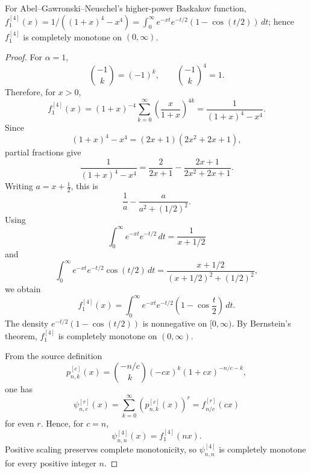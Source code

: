 \begin{proposition}
\label{res:baskakov-r4-alpha1-laplace-density-seed}
For Abel--Gawronski--Neuschel's higher-power Baskakov function, \(f^{[4]}_1(x)=1/((1+x)^4-x^4)=\int_0^\infty e^{-xt}e^{-t/2}(1-\cos(t/2))\,dt\); hence \(f^{[4]}_1\) is completely monotone on \((0,\infty)\).
\end{proposition}
\begin{proof}
For \(\alpha=1\),
\[
\binom{-1}{k}=(-1)^k,
\qquad
\binom{-1}{k}^{4}=1.
\]
Therefore, for \(x>0\),
\[
f^{[4]}_1(x)
=(1+x)^{-4}\sum_{k=0}^{\infty}
\left(\frac{x}{1+x}\right)^{4k}
=\frac{1}{(1+x)^4-x^4}.
\]
Since
\[
(1+x)^4-x^4=(2x+1)(2x^2+2x+1),
\]
partial fractions give
\[
\frac{1}{(1+x)^4-x^4}
=\frac{2}{2x+1}-\frac{2x+1}{2x^2+2x+1}.
\]
Writing \(a=x+\frac12\), this is
\[
\frac{1}{a}-\frac{a}{a^2+(1/2)^2}.
\]
Using
\[
\int_0^\infty e^{-xt}e^{-t/2}\,dt=\frac{1}{x+1/2}
\]
and
\[
\int_0^\infty e^{-xt}e^{-t/2}\cos(t/2)\,dt
=\frac{x+1/2}{(x+1/2)^2+(1/2)^2},
\]
we obtain
\[
f^{[4]}_1(x)
=\int_0^\infty e^{-xt}e^{-t/2}\left(1-\cos\frac{t}{2}\right)\,dt.
\]
The density \(e^{-t/2}(1-\cos(t/2))\) is nonnegative on \([0,\infty)\). By Bernstein's theorem, \(f^{[4]}_1\) is completely monotone on \((0,\infty)\).

From the source definition
\[
p^{[c]}_{n,k}(x)=\binom{-n/c}{k}(-cx)^k(1+cx)^{-n/c-k},
\]
one has
\[
\psi^{[r]}_{n,c}(x)=\sum_{k=0}^{\infty}\left(p^{[c]}_{n,k}(x)\right)^r
=f^{[r]}_{n/c}(cx)
\]
for even \(r\). Hence, for \(c=n\),
\[
\psi^{[4]}_{n,n}(x)=f^{[4]}_1(nx).
\]
Positive scaling preserves complete monotonicity, so \(\psi^{[4]}_{n,n}\) is completely monotone for every positive integer \(n\).
\end{proof}


